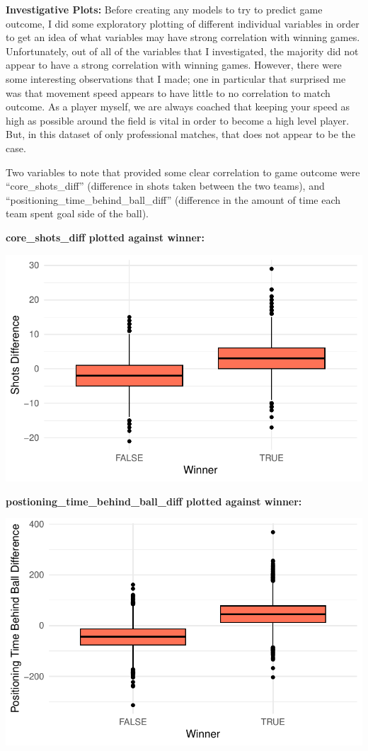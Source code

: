\documentclass[
  letterpaper,
  DIV=11,
  numbers=noendperiod]{scrartcl}
\begin{document}
\textbf{Investigative Plots:} Before creating any models to try to
predict game outcome, I did some exploratory plotting of different
individual variables in order to get an idea of what variables may have
strong correlation with winning games. Unfortunately, out of all of the
variables that I investigated, the majority did not appear to have a
strong correlation with winning games. However, there were some
interesting observations that I made; one in particular that surprised
me was that movement speed appears to have little to no correlation to
match outcome. As a player myself, we are always coached that keeping
your speed as high as possible around the field is vital in order to
become a high level player. But, in this dataset of only professional
matches, that does not appear to be the case.

Two variables to note that provided some clear correlation to game
outcome were ``core\_shots\_diff'' (difference in shots taken between
the two teams), and ``positioning\_time\_behind\_ball\_diff''
(difference in the amount of time each team spent goal side of the
ball).

\textbf{core\_shots\_diff plotted against winner:}

\includegraphics{RL_Write_Up_files/figure-pdf/unnamed-chunk-2-1.pdf}

\textbf{postioning\_time\_behind\_ball\_diff plotted against winner:}

\includegraphics{RL_Write_Up_files/figure-pdf/unnamed-chunk-3-1.pdf}
\end{document}
